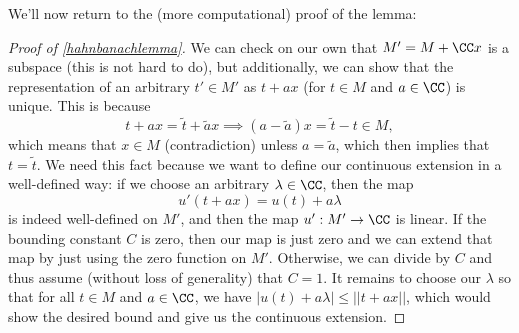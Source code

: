 We'll now return to the (more computational) proof of the lemma:

\begin{proof}[Proof of \cref{hahnbanachlemma}]
We can check on our own that $M' = M + \CC x$ is a subspace (this is not hard to do), but additionally, we can show that the representation of an arbitrary $t' \in M'$ as $t + ax$ (for $t \in M$ and $a \in \CC$) is unique. This is because 
\[
    t + ax = \tilde{t} + \tilde{a}x \implies (a - \tilde{a})x = \tilde{t} -t \in M,
\]
which means that $x \in M$ (contradiction) unless $a = \tilde{a}$, which then implies that $t = \tilde{t}$. We need this fact because we want to define our continuous extension in a well-defined way: if we choose an arbitrary $\lambda \in \CC$, then the map 
\[
    u'(t + ax) = u(t) + a\lambda
\]
is indeed well-defined on $M'$, and then the map $u': M' \to \CC$ is linear. If the bounding constant $C$ is zero, then our map is just zero and we can extend that map by just using the zero function on $M'$. Otherwise, we can divide by $C$ and thus assume (without loss of generality) that $C = 1$. It remains to choose our $\lambda$ so that for all $t \in M$ and $a \in \CC$, we have $|u(t) + a\lambda| \le ||t + ax||$, which would show the desired bound and give us the continuous extension.


\end{proof}
